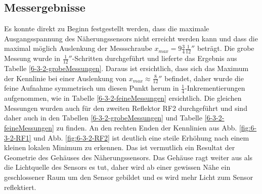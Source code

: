 \documentclass[a4paper]{article}
\begin{document}
\subsection{Messergebnisse}
Es konnte direkt zu Beginn festgestellt werden, dass die maximale Ausgangsspannung
des Näherungssensors nicht erreicht werden kann und dass die maximal möglich
Auslenkung der Messschraube $x_{max}=9 \frac{3}{4} \frac{1}{12}''$ beträgt.
Die grobe Messung wurde in $\frac{1}{12}''$-Schritten durchgeführt und lieferte
das Ergebnis aus Tabelle \ref{6-3-2-grobeMessungen}. Daraus ist ersichtlich, dass
 sich das Maximum der Kennlinie bei einer Auslenkung von
$x_{max}\approx \frac{8}{12}''$ befindet, daher wurde die feine Aufnahme
symmetrisch um diesen Punkt herum in $\frac{1}{4}$-Inkrementierungen aufgenommen,
wie in Tabelle \ref{6-3-2-feineMessungen} ersichtlich.
Die gleichen Messungen wurden auch für den zweiten Reflektor RF2 durchgeführt
und sind daher auch in den Tabellen \ref{6-3-2-grobeMessungen} und Tabelle \ref{6-3-2-feineMessungen}
zu finden. An den rechten Enden der Kennlinien aus Abb. \ref{fig:6-3-2-RF1} und
Abb. \ref{fig:6-3-2-RF2} ist deutlich eine steile Erhöhung nach einem kleinen
lokalen Minimum zu erkennen. Das ist vermutlich ein Resultat der Geometrie des
Gehäuses des Näherungssensors. Das Gehäuse ragt weiter aus als die Lichtquelle
des Sensors es tut, daher wird ab einer gewissen Nähe ein geschlossener Raum um
den Sensor gebildet und es wird mehr Licht zum Sensor reflektiert.
\end{document}

